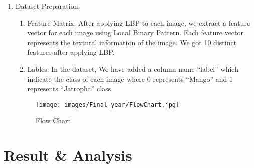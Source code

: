 \documentclass{report}
\begin{document}
{\begin{enumerate}
     \textbf{Disadvantages of LBP:}
    While Local Binary Pattern (LBP) has several advantages for texture analysis, it also has some limitations and potential disadvantages, including::
     \begin{enumerate}
        \item LBP is sensitive to noise in the image. This can affect its ability to accurately capture texture information. The LBP operator compares neighboring pixel intensities, and if there is noise in the image, it can result in incorrect binary values that can affect the resulting LBP histogram.
        \item3.	While LBP is invariant to image rotation, it does not capture rotational information in the texture patterns. This can limit its ability to distinguish between textures that are similar but differ in their rotational patterns.
        \item4.	LBP is typically applied to grayscale images, which means that it does not capture color information in the texture patterns.
    \end{enumerate}
    \item Dataset Preparation:
    \begin{enumerate}
        \item Feature Matrix: After applying LBP to each image, we extract a feature vector for each image using Local Binary Pattern. Each feature vector represents the textural information of the image. We got 10 distinct features after applying LBP.
        \item Lables: In the dataset, We have added a column name “label” which indicate the class of each image where 0 represents “Mango” and 1 represents “Jatropha” class.
    \end{enumerate}
    \begin{figure}[htbp]
        \centering
        \texttt{[image: images/Final year/FlowChart.jpg]} %
        \caption{Flow Chart}
    \end{figure}
    \vspace{1cm}
\end{enumerate}
\chapter{Result \& Analysis}
}
\end{document}
